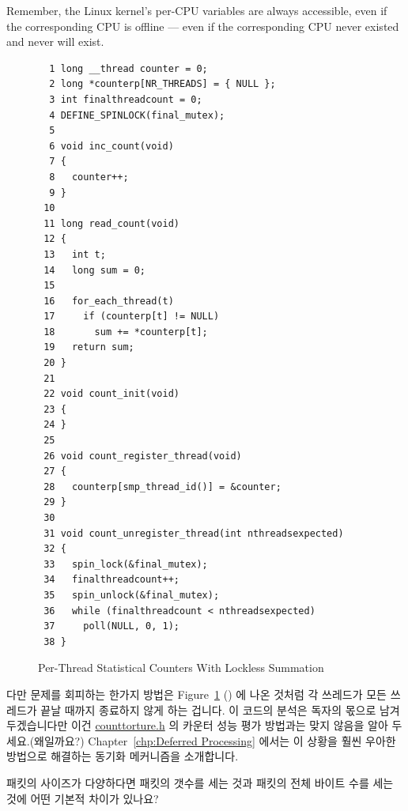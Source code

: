 \begin{enumerate}
	Remember, the Linux kernel's per-CPU variables are always
	accessible, even if the corresponding CPU is offline --- even
	if the corresponding CPU never existed and never will exist.
	\fi

\begin{figure}[tbp]
{ \scriptsize
\begin{verbatim}
  1 long __thread counter = 0;
  2 long *counterp[NR_THREADS] = { NULL };
  3 int finalthreadcount = 0;
  4 DEFINE_SPINLOCK(final_mutex);
  5 
  6 void inc_count(void)
  7 {
  8   counter++;
  9 }
 10 
 11 long read_count(void)
 12 {
 13   int t;
 14   long sum = 0;
 15 
 16   for_each_thread(t)
 17     if (counterp[t] != NULL)
 18       sum += *counterp[t];
 19   return sum;
 20 }
 21 
 22 void count_init(void)
 23 {
 24 }
 25 
 26 void count_register_thread(void)
 27 {
 28   counterp[smp_thread_id()] = &counter;
 29 }
 30 
 31 void count_unregister_thread(int nthreadsexpected)
 32 {
 33   spin_lock(&final_mutex);
 34   finalthreadcount++;
 35   spin_unlock(&final_mutex);
 36   while (finalthreadcount < nthreadsexpected)
 37     poll(NULL, 0, 1);
 38 }
\end{verbatim}
}
\caption{Per-Thread Statistical Counters With Lockless Summation}
\label{fig:count:Per-Thread Statistical Counters With Lockless Summation}
\end{figure}

	다만 문제를 회피하는 한가지 방법은
	Figure~\ref{fig:count:Per-Thread Statistical Counters With Lockless Summation}
	()
	에 나온 것처럼 각 쓰레드가 모든 쓰레드가 끝날 때까지 종료하지 않게 하는
	겁니다.
	이 코드의 분석은 독자의 몫으로 남겨두겠습니다만 이건
	\url{counttorture.h} 의 카운터 성능 평가 방법과는 맞지 않음을 알아
	두세요.(왜일까요?)
	Chapter~\ref{chp:Deferred Processing} 에서는 이 상황을 훨씬 우아한
	방법으로 해결하는 동기화 메커니즘을 소개합니다.

\QuickQ{}
	패킷의 사이즈가 다양하다면 패킷의 갯수를 세는 것과 패킷의 전체 바이트
	수를 세는 것에 어떤 기본적 차이가 있나요?
	\iffalse


\end{enumerate}
